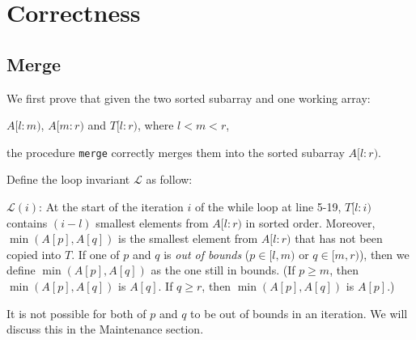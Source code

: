 \documentclass[12pt]{article}
\begin{document}
\section*{Correctness}

\subsection*{Merge}

We first prove that given the two sorted subarray and one working array:
\begin{center}
    \(A[l : m)\), \(A[m : r)\) and \(T[l : r)\), where \(l < m < r\),
\end{center}
the procedure \verb|merge| correctly merges them into the sorted subarray \(A[l : r)\).

Define the loop invariant \(\mathcal{L}\) as follow:

\(\mathcal{L}(i)\): At the start of the iteration \(i\) of the while loop at line 5-19, \(T[l : i)\) contains \((i - l)\) smallest elements from \(A[l : r)\) in sorted order. Moreover, \(\min(A[p], A[q])\) is the smallest element from \(A[l : r)\) that has not been copied into \(T\). If one of \(p\) and \(q\) is \textit{out of bounds} (\(p \in [l, m)\) or \(q \in [m, r)\)), then we define \(\min(A[p], A[q])\) as the one still in bounds. (If \(p \geq m\), then \(\min(A[p], A[q])\) is \(A[q]\). If \(q \geq r\), then \(\min(A[p], A[q])\) is \(A[p]\).)

It is not possible for both of \(p\) and \(q\) to be out of bounds in an iteration. We will discuss this in the Maintenance section.
\end{document}

